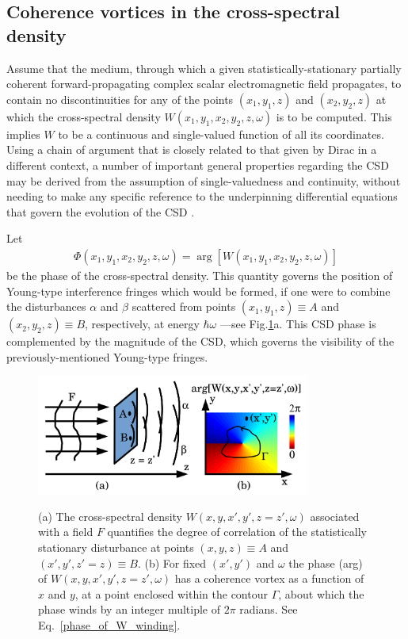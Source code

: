 \documentclass{iucr}              %
\begin{document}
\subsection{Coherence vortices in the cross-spectral density}

Assume that the medium, through which a given statistically-stationary partially coherent forward-propagating complex scalar electromagnetic field propagates, to contain no discontinuities for any of the points $(x_1,y_1,z)$ and $(x_2,y_2,z)$ at which the cross-spectral density $W(x_1,y_1,x_2,y_2,z,\omega)$ is to be computed. This implies $W$ to be a continuous and single-valued function of all its coordinates.  Using a chain of argument that is closely related to that given by Dirac \citeyear{Dirac1931} in a different context, a number of important general properties regarding the CSD may be derived from the assumption of single-valuedness and continuity, without needing to make any specific reference to the underpinning differential equations that govern the evolution of the CSD \cite{Marasinghe2010}. 

Let 
\begin{equation}
\begin{aligned}
\label{phase_of_W}
\Phi(x_1,y_1,x_2,y_2,z,\omega)=\arg[W(x_1,y_1,x_2,y_2,z,\omega)]
\end{aligned}
\end{equation}
be the phase of the cross-spectral density.  This quantity governs the position of Young-type interference fringes which would be formed, if one were to combine the disturbances $\alpha$ and $\beta$ scattered from points $(x_1,y_1,z)\equiv A$ and $(x_2,y_2,z)\equiv B$, respectively, at energy $\hbar\omega$ \cite{mandel_wolf}---see Fig.\ref{loss_of_fringe_visibility}a. This CSD phase is complemented by the magnitude of the CSD, which governs the visibility of the previously-mentioned Young-type fringes.

\begin{figure}
\caption{(a) The cross-spectral density $W(x,y,x',y',z=z',\omega)$ associated with a field $F$ quantifies the degree of correlation of the statistically stationary disturbance at points $(x,y,z)\equiv A$ and $(x',y',z'=z)\equiv B$. (b) For fixed $(x',y')$ and $\omega$ the phase (arg) of $W(x,y,x',y',z=z',\omega)$ has a coherence vortex as a function of $x$ and $y$, at a point enclosed within the contour $\Gamma$, about which the phase winds by an integer multiple of $2\pi$ radians.  See Eq.~\ref{phase_of_W_winding}.}
\includegraphics[width=9.0cm]{Figures/coherence_vortex.png}
\label{loss_of_fringe_visibility}
\end{figure}
\end{document}
